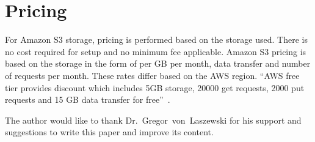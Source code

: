 \section{Pricing}

For Amazon S3 storage, pricing is performed based on the storage used. There is
no cost required for setup and no minimum fee applicable. Amazon S3 pricing is
based on the storage in the form of per GB per month, data transfer and number
of requests per month. These rates differ based on the AWS region. ``AWS free
tier provides discount which includes 5GB storage, 20000 get requests, 2000 put
requests and 15 GB data transfer for
free''~\cite{hid-sp18-420-amazon-S3-pricing}.


\begin{acks}

The author would like to thank Dr.~Gregor~von~Laszewski for his support and
suggestions to write this paper and improve its content.

\end{acks}



 
